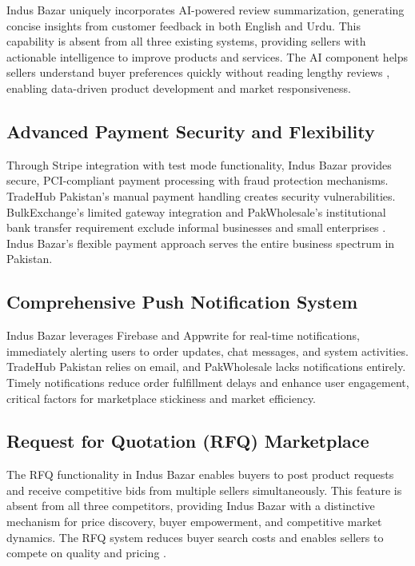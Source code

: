 Indus Bazar uniquely incorporates AI-powered review summarization, generating concise insights from customer feedback in both English and Urdu. This capability is absent from all three existing systems, providing sellers with actionable intelligence to improve products and services. The AI component helps sellers understand buyer preferences quickly without reading lengthy reviews \cite{hussain2023supply}, enabling data-driven product development and market responsiveness.

\subsection{Advanced Payment Security and Flexibility}

Through Stripe integration with test mode functionality, Indus Bazar provides secure, PCI-compliant payment processing with fraud protection mechanisms. TradeHub Pakistan's manual payment handling creates security vulnerabilities. BulkExchange's limited gateway integration and PakWholesale's institutional bank transfer requirement exclude informal businesses and small enterprises \cite{zafar2022trust}. Indus Bazar's flexible payment approach serves the entire business spectrum in Pakistan.

\subsection{Comprehensive Push Notification System}

Indus Bazar leverages Firebase and Appwrite for real-time notifications, immediately alerting users to order updates, chat messages, and system activities. TradeHub Pakistan relies on email, and PakWholesale lacks notifications entirely. Timely notifications reduce order fulfillment delays and enhance user engagement, critical factors for marketplace stickiness and market efficiency.

\subsection{Request for Quotation (RFQ) Marketplace}

The RFQ functionality in Indus Bazar enables buyers to post product requests and receive competitive bids from multiple sellers simultaneously. This feature is absent from all three competitors, providing Indus Bazar with a distinctive mechanism for price discovery, buyer empowerment, and competitive market dynamics. The RFQ system reduces buyer search costs and enables sellers to compete on quality and pricing \cite{raza2023impact}.

